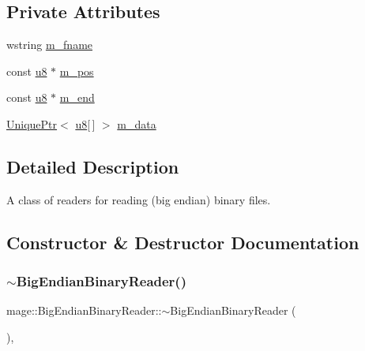 \subsection*{Private Attributes}
\begin{DoxyCompactItemize}
\item 
wstring \hyperlink{classmage_1_1_big_endian_binary_reader_a0f836aec582a59f156b64bffb9653e41}{m\+\_\+fname}
\item 
const \hyperlink{namespacemage_a5a362e2d56fc439362a80516ecae7828}{u8} $\ast$ \hyperlink{classmage_1_1_big_endian_binary_reader_aa65fd106fc7b4f66ead8e26d06179ff2}{m\+\_\+pos}
\item 
const \hyperlink{namespacemage_a5a362e2d56fc439362a80516ecae7828}{u8} $\ast$ \hyperlink{classmage_1_1_big_endian_binary_reader_a6a11e76de21a40a009aa01096ba71058}{m\+\_\+end}
\item 
\hyperlink{namespacemage_a3316d7143a973e37adf1110f2e80ca31}{Unique\+Ptr}$<$ \hyperlink{namespacemage_a5a362e2d56fc439362a80516ecae7828}{u8}\mbox{[}$\,$\mbox{]} $>$ \hyperlink{classmage_1_1_big_endian_binary_reader_ab140977ce1b7a77d4b9963f976e589ac}{m\+\_\+data}
\end{DoxyCompactItemize}


\subsection{Detailed Description}
A class of readers for reading (big endian) binary files. 

\subsection{Constructor \& Destructor Documentation}
\hypertarget{classmage_1_1_big_endian_binary_reader_ae85a40e8ed06e8c887e38d914843b8d3}{}\label{classmage_1_1_big_endian_binary_reader_ae85a40e8ed06e8c887e38d914843b8d3} 
\subsubsection{\texorpdfstring{$\sim$\+Big\+Endian\+Binary\+Reader()}{~BigEndianBinaryReader()}}
{\footnotesize\ttfamily mage\+::\+Big\+Endian\+Binary\+Reader\+::$\sim$\+Big\+Endian\+Binary\+Reader (\begin{DoxyParamCaption}{ }\end{DoxyParamCaption})\hspace{0.3cm}{\ttfamily [virtual]}, {\ttfamily [default]}}

